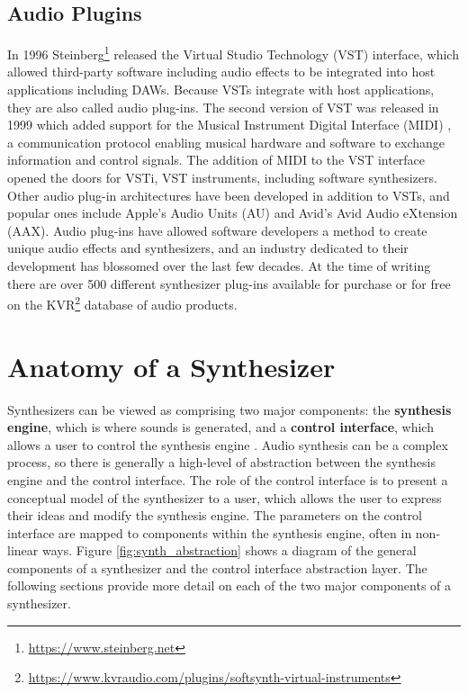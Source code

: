 \subsection{Audio Plugins}
In 1996 Steinberg\footnote{\url{https://www.steinberg.net}} released the Virtual Studio Technology (VST) interface, which allowed third-party software including audio effects to be integrated into host applications including DAWs. Because VSTs integrate with host applications, they are also called audio plug-ins. The second version of VST was released in 1999 which added support for the Musical Instrument Digital Interface (MIDI) \cite{rothstein1992midi}, a communication protocol enabling musical hardware and software to exchange information and control signals. The addition of MIDI to the VST interface opened the doors for VSTi, VST instruments, including software synthesizers. Other audio plug-in architectures have been developed in addition to VSTs, and popular ones include Apple's Audio Units (AU) and Avid's Avid Audio eXtension (AAX). Audio plug-ins have allowed software developers a method to create unique audio effects and synthesizers, and an industry dedicated to their development has blossomed over the last few decades. At the time of writing there are over 500 different synthesizer plug-ins available for purchase or for free on the KVR\footnote{\url{https://www.kvraudio.com/plugins/softsynth-virtual-instruments}} database of audio products.

\section{Anatomy of a Synthesizer}
\label{section:synth-anatomy}

Synthesizers can be viewed as comprising two major components: the \textbf{synthesis engine}, which is where sounds is generated, and a \textbf{control interface}, which allows a user to control the synthesis engine \cite{russ2012sound}. Audio synthesis can be a complex process, so there is generally a high-level of abstraction between the synthesis engine and the control interface. The role of the control interface is to present a conceptual model of the synthesizer to a user, which allows the user to express their ideas and modify the synthesis engine. The parameters on the control interface are mapped to components within the synthesis engine, often in non-linear ways. Figure \ref{fig:synth_abstraction} shows a diagram of the general components of a synthesizer and the control interface abstraction layer. The following sections provide more detail on each of the two major components of a synthesizer.

